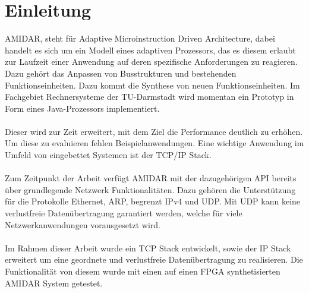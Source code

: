 \chapter{Einleitung}

AMIDAR, steht für Adaptive Microinstruction Driven Architecture, dabei handelt es sich um ein Modell eines adaptiven Prozessors, das es diesem erlaubt zur Laufzeit einer Anwendung auf deren spezifische Anforderungen zu reagieren. Dazu gehört das Anpassen von Busstrukturen und bestehenden Funktionseinheiten. Dazu kommt die Synthese von neuen Funktionseinheiten.
Im Fachgebiet Rechnersysteme der TU-Darmstadt wird momentan ein Prototyp in Form eines Java-Prozessors implementiert. \\\\
Dieser wird zur Zeit erweitert, mit dem Ziel die Performance deutlich zu erhöhen. Um diese zu evaluieren fehlen Beispielanwendungen. Eine wichtige Anwendung im Umfeld von eingebettet Systemen ist der TCP/IP Stack.\\\\
Zum Zeitpunkt der Arbeit verfügt AMIDAR mit der dazugehörigen API bereits über grundlegende Netzwerk Funktionalitäten. Dazu gehören die Unterstützung für die Protokolle Ethernet, ARP, begrenzt IPv4 und UDP. Mit UDP kann keine verlustfreie Datenübertragung garantiert werden, welche für viele Netzwerkanwendungen vorausgesetzt wird.\\\\
Im Rahmen dieser Arbeit wurde ein TCP Stack entwickelt, sowie der IP Stack erweitert um eine geordnete und verlustfreie Datenübertragung zu realisieren. Die Funktionalität von diesem wurde mit einen auf einen FPGA synthetisierten AMIDAR System getestet.
